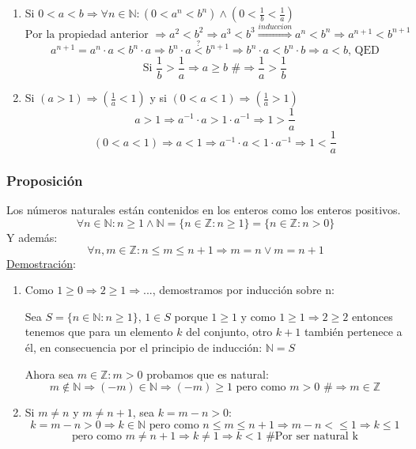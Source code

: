\documentclass[10pt,a4paper,openright]{book}
\theoremstyle{break}
\begin{document}
\begin{enumerate}
\item Si $0<a<b\Rightarrow \forall n \in \mathbb N : (0<a^n<b^n)\wedge (0<\frac{1}{b}<\frac{1}{a})$
$$\mbox{Por la propiedad anterior }\Rightarrow a^2<b^2\Rightarrow a^3<b^3\stackrel{induccion}{\Rightarrow} a^n<b^n\Rightarrow a^{n+1}<b^{n+1}$$
$$a^{n+1}=a^n\cdot a<b^n\cdot a\Rightarrow b^n\cdot a\stackrel{?}{<}b^{n+1}\Rightarrow b^n\cdot a< b^n\cdot b \Rightarrow a<b \mbox{, QED}$$
\vspace{0.25cm}
$$\mbox{Si } \frac{1}{b}>\frac{1}{a}\Rightarrow a\geq b \mbox{ \#}\Rightarrow \frac{1}{a}>\frac{1}{b}$$
\vspace{0.5cm}

\item Si $(a>1)\Rightarrow (\frac{1}{a}<1)$ y si $(0<a<1)\Rightarrow (\frac{1}{a}>1)$
$$a>1\Rightarrow a^{-1}\cdot a>1\cdot a^{-1}\Rightarrow 1>\frac{1}{a}$$
$$(0<a<1)\Rightarrow a<1\Rightarrow a^{-1}\cdot a<1\cdot a^{-1}\Rightarrow 1<\frac{1}{a}$$
\end{enumerate}

\subsubsection{Proposición}
Los números naturales están contenidos en los enteros como los enteros positivos.
$$\forall n \in \mathbb N: n\geq 1 \wedge \mathbb N =\{n\in \mathbb Z: n\geq 1\}=\{n\in \mathbb Z : n>0\}$$
Y además:
$$\forall n,m\in \mathbb Z : n\leq m\leq n+1\Rightarrow m=n\vee m=n+1$$
\underline{Demostración}:
\begin{enumerate}
\item Como $1\geq 0\Rightarrow 2\geq 1 \Rightarrow ...$, demostramos por inducción sobre n:\par
Sea $S=\{n\in \mathbb N: n\geq 1\}$, $1\in S$ porque $1\geq 1$ y como $1\geq 1\Rightarrow 2\geq 2$ entonces tenemos que para un elemento $k$ del conjunto, otro $k+1$ también pertenece a él, en consecuencia por el principio de inducción: $\mathbb N=S$\par
Ahora sea $m\in \mathbb Z: m>0$ probamos  que es natural:
$$m\notin \mathbb N \Rightarrow (-m)\in \mathbb N \Rightarrow (-m)\geq  1\mbox{ pero como }m>0 \mbox{ \#}\Rightarrow m\in \mathbb Z$$
\vspace{0.5cm}
\item Si $m\neq n$ y $m\neq n+1$, sea $k=m-n>0$:
$$k=m-n>0\Rightarrow k\in \mathbb N \mbox{ pero como }n\leq m \leq n+1\Rightarrow m-n<\leq 1 \Rightarrow k\leq 1$$
$$\mbox{ pero como }m\neq n+1\Rightarrow k\neq 1\Rightarrow k<1\mbox{ \# Por ser natural k }$$
\end{enumerate}
\end{document}
